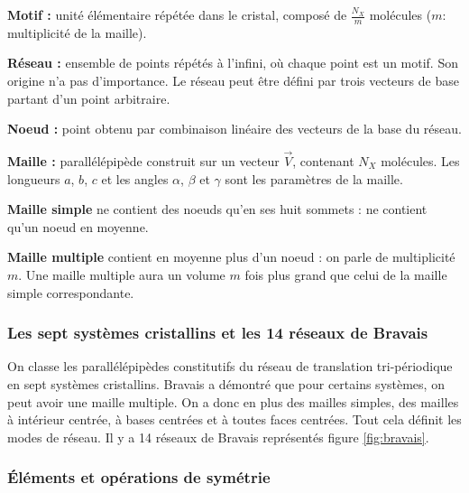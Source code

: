 \documentclass{article}
\begin{document}
\noindent\textbf{Motif :} unité élémentaire répétée dans le cristal, composé de $\frac{N_X}{m}$ molécules ($m$: multiplicité de la maille).

\noindent\textbf{Réseau :} ensemble de points répétés à l'infini, où chaque point est un motif. Son origine n'a pas d'importance.
Le réseau peut être défini par trois vecteurs de base partant d'un point arbitraire.

\noindent\textbf{Noeud :} point obtenu par combinaison linéaire des vecteurs de la base du réseau.

\noindent\textbf{Maille :} parallélépipède construit sur un vecteur $\vec V$, contenant $N_X$ molécules.
Les longueurs $a$, $b$, $c$ et les angles $\alpha$, $\beta$ et $\gamma$ sont les paramètres de la maille.

\noindent\textbf{Maille simple} ne contient des noeuds qu'en ses huit sommets : ne contient qu'un noeud en moyenne.

\noindent\textbf{Maille multiple} contient en moyenne plus d'un noeud : on parle de multiplicité $m$.
Une maille multiple aura un volume $m$ fois plus grand que celui de la maille simple correspondante.


\subsubsection{Les sept systèmes cristallins et les 14 réseaux de Bravais}\label{subsec:les-sept-systemes-cristallins-et-les-14-reseaux-de-bravais}

On classe les parallélépipèdes constitutifs du réseau de translation tri-périodique en sept systèmes cristallins.
Bravais a démontré que pour certains systèmes, on peut avoir une maille multiple.
On a donc en plus des mailles simples, des mailles à intérieur centrée, à bases centrées et à toutes faces centrées.
Tout cela définit les modes de réseau.
Il y a 14 réseaux de Bravais représentés figure \ref{fig:bravais}.

\vspace{0.4cm}
\subsubsection{Éléments et opérations de symétrie}\label{subsec:elements-et-operations-de-symetrie}
\end{document}
